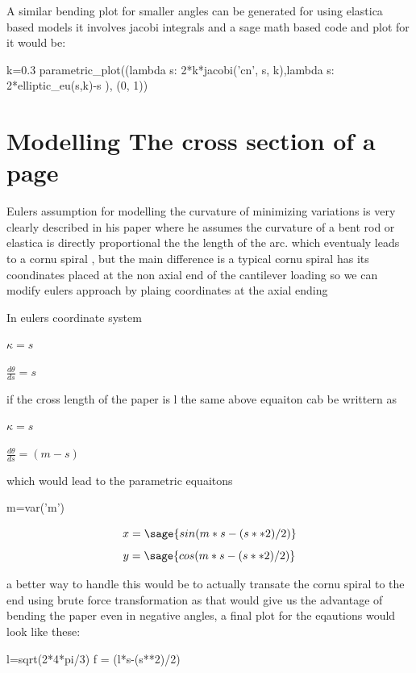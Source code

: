 \documentclass[longbibliography]{revtex4-1}
\begin{document}
A similar bending plot for smaller angles can be generated for using elastica based models it involves jacobi integrals and a sage math based code and plot for it would be:

\begin{sageblock}
k=0.3
parametric_plot((lambda s: 2*k*jacobi('cn', s, k),lambda s: 2*elliptic_eu(s,k)-s ), (0, 1))
\end{sageblock}


\begin{center}
\end{center}

\section{Modelling The cross section of a page}

Eulers assumption for modelling the curvature of minimizing variations is very clearly described in his paper where he assumes the curvature of a bent rod or elastica is directly proportional the the length of the arc. which eventualy leads to a cornu spiral , but the main difference is a typical cornu spiral has its coondinates placed at the non axial end of the cantilever loading so we can modify eulers approach by plaing coordinates at the axial ending

In eulers coordinate system

$\kappa=s$

$\frac{d\theta}{ds} =s$


if the cross length of the paper is l the same above equaiton cab be writtern as

$\kappa=s$

$\frac{d\theta}{ds} =(m-s)$

which would lead to the parametric equaitons 

\begin{sagesilent}
m=var('m')
\end{sagesilent}

\[
x=\sage{sin(m*s-(s**2)/2)}
\]
\[
y=\sage{cos(m*s-(s**2)/2)}
\]

a better way to handle this would be to actually transate the cornu spiral to the end using brute force transformation as that would give us the advantage of bending the paper even in negative angles, a final plot for the eqautions would look like these:

\begin{sagesilent}
l=sqrt(2*4*pi/3)
f = (l*s-(s**2)/2)
\end{sagesilent}
\end{document}
